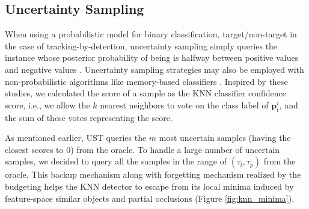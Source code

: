 \documentclass[conference,twoside]{IEEEtran}
\begin{document}

\subsection{Uncertainty Sampling} 
\label{sect:uncertainty}
When using a probabilistic model for binary classification, target/non-target in the case of tracking-by-detection, uncertainty sampling simply queries the instance whose posterior probability of being is halfway between positive values and negative values \cite{lewis1994sequential}. Uncertainty sampling strategies may also be employed with non-probabilistic
algorithms like memory-based classifiers \cite{lindenbaum2004selective}. Inspired by these studies, we calculated the score of a sample as the KNN classifier confidence score, i.e., we allow the $k$ nearest neighbors to vote on the class label of $\mathbf{p}_t^i$, and the sum of these votes representing the score. 

As mentioned earlier, UST queries the $m$ most uncertain samples (having the closest scores to 0) from the oracle. To handle a large number of uncertain samples, we decided to query all the samples in the range of $(\tau_l,\tau_p)$ from the oracle. This backup mechanism along with forgetting mechanism realized by the budgeting helps the KNN detector to escape from its local minima induced by feature-space similar objects and partial occlusions (Figure \ref{fig:knn_minima}).
\end{document}
